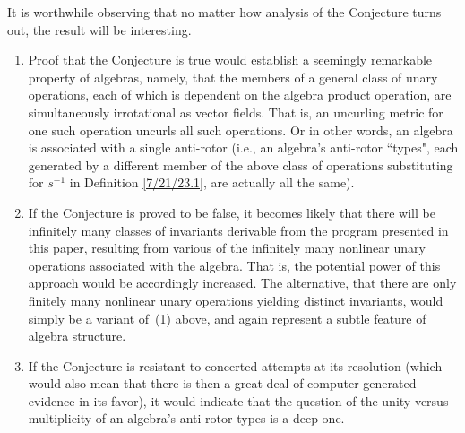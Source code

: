 \documentclass{amsart}
\numberwithin{equation}{section}
\theoremstyle{definition}
\numberwithin{theorem}{section}
\begin{document}
It is worthwhile observing that no matter how analysis of the Conjecture turns out, the result will be interesting.  \begin{enumerate}\item Proof that the Conjecture is true would establish a seemingly remarkable property of algebras, namely, that the members of a general class of unary operations, each of which is dependent on the algebra product operation, are simultaneously irrotational as vector fields.  That is, an uncurling metric for one such operation uncurls all such operations.  Or in other words, an algebra is associated with a single anti-rotor (i.e., an algebra's anti-rotor ``types", each generated by a different member of the above class of operations substituting for $s^{-1}$ in Definition \ref{7/21/23.1}, are actually all the same).  \item If the Conjecture is proved to be false, it becomes likely that there will be infinitely many classes of invariants derivable from the program presented in this paper, resulting from various of the infinitely many nonlinear unary operations associated with the algebra.  That is, the potential power of this approach would be accordingly increased.  The alternative, that there are only finitely many nonlinear unary operations yielding distinct invariants, would simply be a variant \mbox{of (1)} above, and again represent a subtle feature of algebra structure.  \item If the Conjecture is resistant to concerted attempts at its resolution (which would also mean that there is then a great deal of computer-generated evidence in its favor), it would indicate that the question of the unity versus multiplicity of an algebra's anti-rotor types is a deep one. \end{enumerate}
\end{document}
